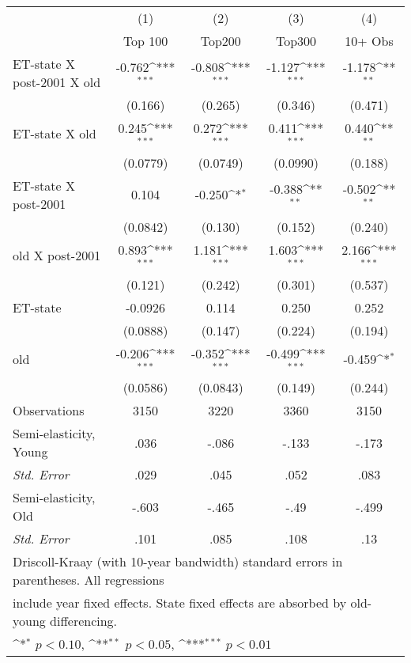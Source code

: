 {
\def\sym#1{\ifmmode^{#1}\else\(^{#1}\)\fi}
\begin{tabular}{l*{4}{c}}
\hline\hline
                &\multicolumn{1}{c}{(1)}&\multicolumn{1}{c}{(2)}&\multicolumn{1}{c}{(3)}&\multicolumn{1}{c}{(4)}\\
                &\multicolumn{1}{c}{Top 100}&\multicolumn{1}{c}{Top200}&\multicolumn{1}{c}{Top300}&\multicolumn{1}{c}{10+ Obs}\\
\hline
ET-state X post-2001 X old&   -0.762\sym{***}&   -0.808\sym{***}&   -1.127\sym{***}&   -1.178\sym{**} \\
                &  (0.166)         &  (0.265)         &  (0.346)         &  (0.471)         \\
[1em]
ET-state X old  &    0.245\sym{***}&    0.272\sym{***}&    0.411\sym{***}&    0.440\sym{**} \\
                & (0.0779)         & (0.0749)         & (0.0990)         &  (0.188)         \\
[1em]
ET-state X post-2001&    0.104         &   -0.250\sym{*}  &   -0.388\sym{**} &   -0.502\sym{**} \\
                & (0.0842)         &  (0.130)         &  (0.152)         &  (0.240)         \\
[1em]
old X post-2001 &    0.893\sym{***}&    1.181\sym{***}&    1.603\sym{***}&    2.166\sym{***}\\
                &  (0.121)         &  (0.242)         &  (0.301)         &  (0.537)         \\
[1em]
ET-state        &  -0.0926         &    0.114         &    0.250         &    0.252         \\
                & (0.0888)         &  (0.147)         &  (0.224)         &  (0.194)         \\
[1em]
old             &   -0.206\sym{***}&   -0.352\sym{***}&   -0.499\sym{***}&   -0.459\sym{*}  \\
                & (0.0586)         & (0.0843)         &  (0.149)         &  (0.244)         \\
\hline
Observations    &     3150         &     3220         &     3360         &     3150         \\
Semi-elasticity, Young      &     .036         &    -.086         &    -.133         &    -.173         \\
\quad \textit{Std. Error}    &     .029         &     .045         &     .052         &     .083         \\
Semi-elasticity, Old        &    -.603         &    -.465         &     -.49         &    -.499         \\
\quad \textit{Std. Error}      &     .101         &     .085         &     .108         &      .13         \\
\hline \hline
\multicolumn{5}{l}{\footnotesize Driscoll-Kraay (with 10-year bandwidth) standard errors in parentheses. All regressions} \\
\multicolumn{5}{l}{\footnotesize include year fixed effects. State fixed effects are absorbed by old-young differencing.} \\
\multicolumn{5}{l}{\footnotesize \sym{*} \(p<0.10\), \sym{**} \(p<0.05\), \sym{***} \(p<0.01\)}  \end{tabular} }
